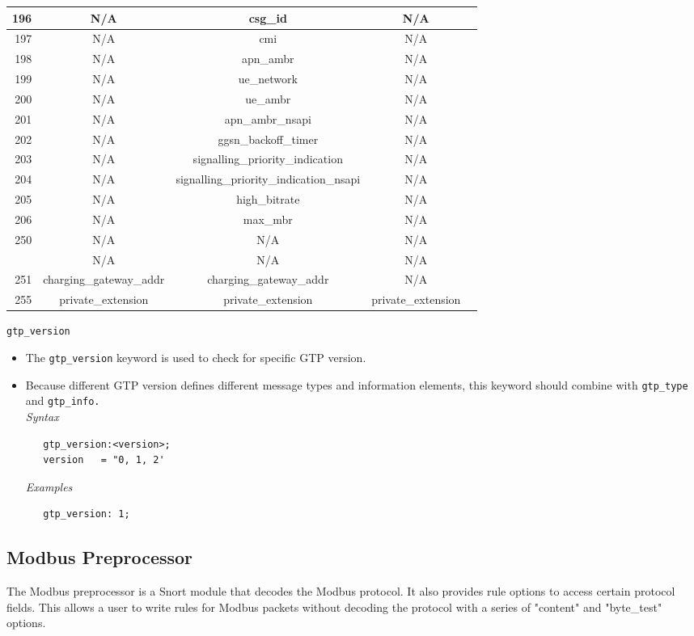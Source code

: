 \documentclass[english]{report}
\begin{document}
\begin{itemize}
\begin{longtable}{|r|c|c|c|p{13.5cm}|}
\hline
196 & N/A & csg\_id & N/A\\
\hline
197 & N/A & cmi & N/A\\
\hline
198 & N/A & apn\_ambr & N/A\\
\hline
199 & N/A & ue\_network & N/A\\
\hline
200 & N/A & ue\_ambr & N/A\\
\hline
201 & N/A & apn\_ambr\_nsapi & N/A\\
\hline
202 & N/A & ggsn\_backoff\_timer & N/A\\
\hline
203 & N/A & signalling\_priority\_indication & N/A\\
\hline
204 & N/A & signalling\_priority\_indication\_nsapi & N/A\\
\hline
205 & N/A & high\_bitrate & N/A\\
\hline
206 & N/A & max\_mbr & N/A\\
\hline
250 & N/A & N/A & N/A\\
\hline
 & N/A & N/A & N/A\\
\hline
251 & charging\_gateway\_addr & charging\_gateway\_addr & N/A\\
\hline
255 & private\_extension & private\_extension & private\_extension\\
\hline
\end{longtable}
\end{itemize}
\texttt{gtp\_version}
\label{gtp:gtp_version}
\begin{itemize}
 \item[]  The \texttt{gtp\_version} keyword is used to check for specific 
GTP version.  
 \item[]  Because different GTP version defines different message types and
 information elements, this keyword should combine with \texttt{gtp\_type} 
and \texttt{gtp\_info.}\\

\textit{Syntax}
\footnotesize
\begin{verbatim}
   gtp_version:<version>;
   version   = "0, 1, 2'
\end{verbatim}
\normalsize
\textit{Examples}
\footnotesize
\begin{verbatim}
   gtp_version: 1;
\end{verbatim}
\normalsize
\end{itemize}

\subsection{Modbus Preprocessor}
\label{sub:modbus}
The Modbus preprocessor is a Snort module that decodes the Modbus protocol.
It also provides rule options to access certain protocol fields.
This allows a user to write rules for Modbus packets without decoding the protocol
with a series of "content" and "byte\_test" options.
\end{document}
